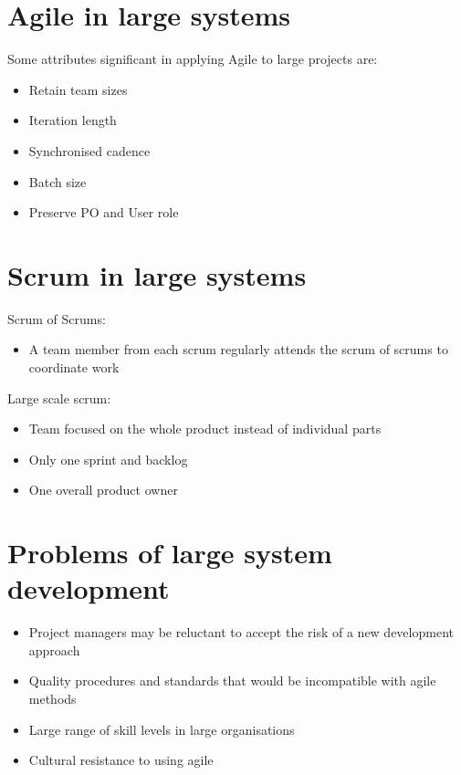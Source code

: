 \documentclass{article}[18pt]
\begin{document}
\section{Agile in large systems}
Some attributes significant in applying Agile to large projects are:
\begin{itemize}
	\item Retain team sizes
	\item Iteration length
	\item Synchronised cadence
	\item Batch size
	\item Preserve PO and User role
\end{itemize}
\section{Scrum in large systems}
Scrum of Scrums:
\begin{itemize}
	\item A team member from each scrum regularly attends the scrum of scrums to coordinate work
\end{itemize}
Large scale scrum:
\begin{itemize}
	\item Team focused on the whole product instead of individual parts
	\item Only one sprint and backlog
	\item One overall product owner
\end{itemize}
\section{Problems of large system development}
\begin{itemize}
	\item Project managers may be reluctant to accept the risk of a new development approach
	\item Quality procedures and standards that would be incompatible with agile methods
	\item Large range of skill levels in large organisations
	\item Cultural resistance to using agile
\end{itemize}
\end{document}
